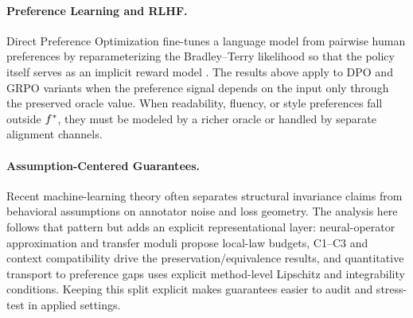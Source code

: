 \paragraph{Preference Learning and RLHF.}
Direct Preference Optimization fine-tunes a language model from pairwise
human preferences by reparameterizing the Bradley--Terry likelihood so
that the policy itself serves as an implicit reward model
\citep{BradleyTerry1952,RafailovEtAl2023DPO}. The results above apply to
DPO and GRPO variants when the preference signal depends on the input only
through the preserved oracle value. When readability, fluency, or style
preferences fall outside $f^\ast$, they must be modeled by a richer oracle
or handled by separate alignment channels.

\paragraph{Assumption-Centered Guarantees.}
Recent machine-learning theory often separates structural invariance
claims from behavioral assumptions on annotator noise and loss geometry.
The analysis here follows that pattern but adds an explicit
representational layer: neural-operator approximation and transfer moduli
propose local-law budgets, C1--C3 and context compatibility drive the
preservation/equivalence results, and quantitative transport to preference
gaps uses explicit method-level Lipschitz and integrability conditions.
Keeping this split explicit makes guarantees easier to audit and
stress-test in applied settings.
